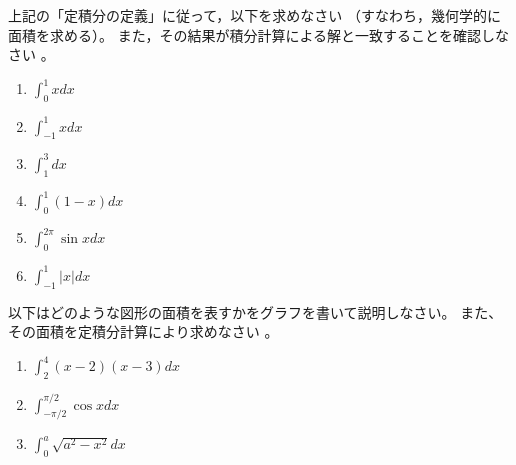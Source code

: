 \documentclass[twocolumn,11pt]{jarticle}
\begin{document}
\nexercise
上記の「定積分の定義」に従って，以下を求めなさい
（すなわち，幾何学的に面積を求める）。
また，その結果が積分計算による解と一致することを確認しなさい
。
\begin{enumerate}
\item\label{iitem:int_0^1xdx} $\displaystyle\int_0^1xdx$
\item\label{iitem:int_-1^1xdx} $\displaystyle\int_{-1}^1xdx$
\item\label{iitem:int_1^3dx} $\displaystyle\int_1^3dx$
\item\label{iitem:int_0^1(1-x)dx} $\displaystyle\int_0^1(1-x)dx$
\item\label{iitem:int_0^2pisinxdx} $\displaystyle\int_0^{2\pi} \sin x dx$
\item\label{iitem:int_-1^1|x|dx} $\displaystyle\int_{-1}^1|x|dx$
\end{enumerate}

\nexercise
以下はどのような図形の面積を表すかをグラフを書いて説明しなさい。
また、その面積を定積分計算により求めなさい
。
\begin{enumerate}
\item\label{iitem:int_2^4(x-2)(x-3)dx} $\displaystyle\int_2^4(x-2)(x-3) dx$
\item\label{iitem:int_(-pi/2)^(pi/2)cos xdx}
  $\displaystyle\int_{-\pi/2}^{\pi/2}\cos x dx$
\item\label{iitem:int_0^asqrt(a^2-x^2)dx} $\displaystyle\int_0^a \sqrt{a^2-x^2}dx$
\end{enumerate}
\end{document}
